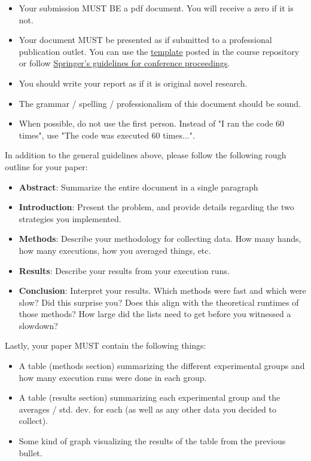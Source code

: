 \documentclass[paper=a4, fontsize=11pt, parskip=full]{scrartcl} %
\numberwithin{equation}{section} %
\numberwithin{figure}{section} %
\numberwithin{table}{section} %
\begin{document}
\begin{itemize}
	\item Your submission MUST BE a pdf document. You will receive a zero if it is not.
	\item Your document MUST be presented as if submitted to a professional publication outlet. You can use the \href{https://uva-cs.github.io/dsa1/homeworks/WordPaperTemplate.zip}{template} posted in the course repository or follow \href{https://www.springer.com/us/computer-science/lncs/conference-proceedings-guidelines}{Springer's guidelines for conference proceedings}.
	\item You should write your report as if it is original novel research.
	\item The grammar / spelling / professionalism of this document should be sound.
	\item When possible, do not use the first person. Instead of "I ran the code 60 times", use "The code was executed 60 times...".
\end{itemize}

In addition to the general guidelines above, please follow the following rough outline for your paper:

\begin{itemize}
	\item \textbf{Abstract}: Summarize the entire document in a single paragraph
	\item \textbf{Introduction}: Present the problem, and provide details regarding the two strategies you implemented.
	\item \textbf{Methods}: Describe your methodology for collecting data. How many hands, how many executions, how you averaged things, etc.
	\item \textbf{Results}: Describe your results from your execution runs.
	\item \textbf{Conclusion}: Interpret your results. Which methods were fast and which were slow? Did this surprise you? Does this align with the theoretical runtimes of those methods? How large did the lists need to get before you witnessed a slowdown?
\end{itemize}

Lastly, your paper MUST contain the following things:

\begin{itemize}
	\item A table (methods section) summarizing the different experimental groups and how many execution runs were done in each group.
	\item A table (results section) summarizing each experimental group and the averages / std. dev. for each (as well as any other data you decided to collect).
	\item Some kind of graph visualizing the results of the table from the previous bullet.
\end{itemize}


\end{document}
